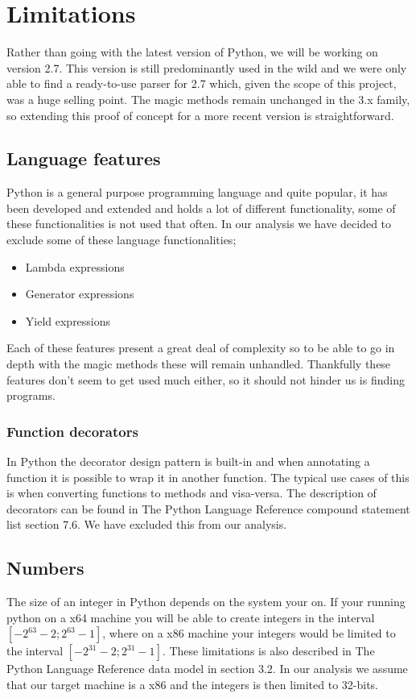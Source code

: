 \chapter{Limitations}

Rather than going with the latest version of Python, we will be working on version 2.7. This version is still predominantly used in the wild and we were only able to find a ready-to-use parser for 2.7 which, given the scope of this project, was a huge selling point. The magic methods remain unchanged in the 3.x family, so extending this proof of concept for a more recent version is straightforward.

\section{Language features}
Python is a general purpose programming language and quite popular, it has been developed and extended and holds a lot of different functionality, some of these functionalities is not used that often. In our analysis we have decided to exclude some of these language functionalities;

\begin{itemize}
	\item Lambda expressions
	\item Generator expressions
	\item Yield expressions
\end{itemize}

Each of these features present a great deal of complexity so to be able to go in depth with the magic methods these will remain unhandled. Thankfully these features don't seem to get used much either, so it should not hinder us is finding programs.


\subsection{Function decorators}
In Python the decorator design pattern is built-in and when annotating a function it is possible to wrap it in another function. The typical use cases of this is when converting functions to methods and visa-versa. The description of decorators can be found in The Python Language Reference compound statement list\cite{pyref.compound} section 7.6. We have excluded this from our analysis.

\section{Numbers}
The size of an integer in Python depends on the system your on. If your running python on a x64 machine you will be able to create integers in the interval $[-2^{63}-2;2^{63}-1]$, where on a x86 machine your integers would be limited to the interval $[-2^{31}-2;2^{31}-1]$. These limitations is also described in The Python Language Reference data model\cite{pyref.datamodel} in section 3.2. In our analysis we assume that our target machine is a x86 and the integers is then limited to 32-bits.

